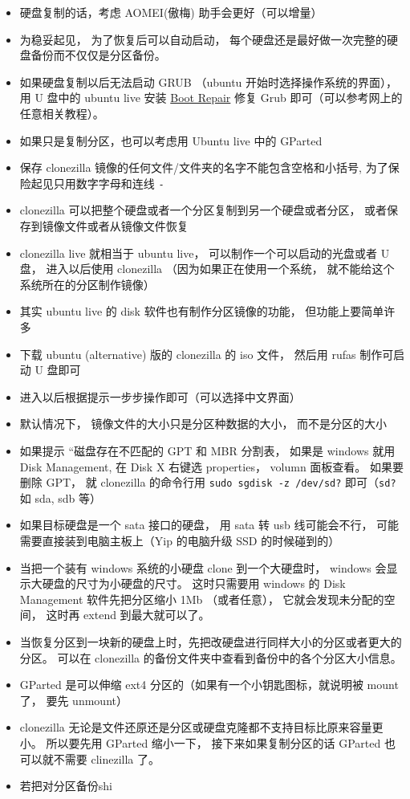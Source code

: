 
\begin{issues}
\issueDraft
\end{issues}

\begin{itemize}
\item 硬盘复制的话，考虑 AOMEI(傲梅) 助手会更好（可以增量）
\item 为稳妥起见， 为了恢复后可以自动启动， 每个硬盘还是最好做一次完整的硬盘备份而不仅仅是分区备份。
\item 如果硬盘复制以后无法启动 GRUB （ubuntu 开始时选择操作系统的界面）， 用 U 盘中的 ubuntu live 安装 \href{https://help.ubuntu.com/community/Boot-Repair}{Boot Repair} 修复 Grub 即可（可以参考网上的任意相关教程）。
\item 如果只是复制分区，也可以考虑用 Ubuntu live 中的 GParted
\item 保存 clonezilla 镜像的任何文件/文件夹的名字不能包含空格和小括号, 为了保险起见只用数字字母和连线 \verb`-`
\item clonezilla 可以把整个硬盘或者一个分区复制到另一个硬盘或者分区， 或者保存到镜像文件或者从镜像文件恢复
\item clonezilla live 就相当于 ubuntu live， 可以制作一个可以启动的光盘或者 U 盘， 进入以后使用 clonezilla （因为如果正在使用一个系统， 就不能给这个系统所在的分区制作镜像）
\item 其实 ubuntu live 的 disk 软件也有制作分区镜像的功能， 但功能上要简单许多

\item 下载 ubuntu (alternative) 版的 clonezilla 的 iso 文件， 然后用 rufas 制作可启动 U 盘即可
\item 进入以后根据提示一步步操作即可（可以选择中文界面）
\item 默认情况下， 镜像文件的大小只是分区种数据的大小， 而不是分区的大小

\item 如果提示 “磁盘存在不匹配的 GPT 和 MBR 分割表， 如果是 windows 就用 Disk Management, 在 Disk X 右键选 properties， volumn 面板查看。 如果要删除 GPT， 就 clonezilla 的命令行用 \verb|sudo sgdisk -z /dev/sd?| 即可（\verb|sd?| 如 sda, sdb 等）
\item 如果目标硬盘是一个 sata 接口的硬盘， 用 sata 转 usb 线可能会不行， 可能需要直接装到电脑主板上（Yip 的电脑升级 SSD 的时候碰到的）
\item 当把一个装有 windows 系统的小硬盘 clone 到一个大硬盘时， windows 会显示大硬盘的尺寸为小硬盘的尺寸。 这时只需要用 windows 的 Disk Management 软件先把分区缩小 1Mb （或者任意）， 它就会发现未分配的空间， 这时再 extend 到最大就可以了。
\item 当恢复分区到一块新的硬盘上时，先把改硬盘进行同样大小的分区或者更大的分区。 可以在 clonezilla 的备份文件夹中查看到备份中的各个分区大小信息。
\end{itemize}

\begin{itemize}
\item GParted 是可以伸缩 ext4 分区的（如果有一个小钥匙图标，就说明被 mount 了， 要先 unmount）
\item clonezilla 无论是文件还原还是分区或硬盘克隆都不支持目标比原来容量更小。 所以要先用 GParted 缩小一下， 接下来如果复制分区的话 GParted 也可以就不需要 clinezilla 了。
\item 若把对分区备份shi
\end{itemize}

